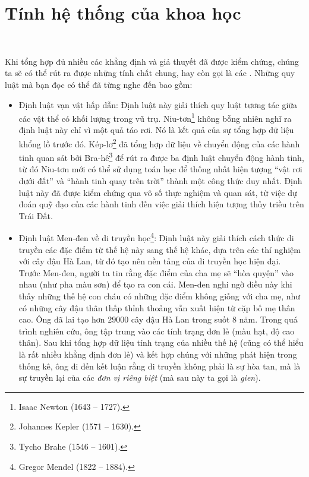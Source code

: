 \section{Tính hệ thống của khoa học}

\

Khi tổng hợp đủ nhiều các khẳng định và giả thuyết đã được kiểm chứng, chúng ta sẽ có thể rút ra được những tính chất chung, hay còn gọi là các . Những quy luật mà bạn đọc có thể đã từng nghe đến bao gồm:
\begin{itemize}
    \item \textcolor{colorEmphasisCyan}{Định luật vạn vật hấp dẫn}: Định luật này giải thích quy luật tương tác giữa các vật thể có khối lượng trong vũ trụ. Niu-tơn\footnote{Isaac Newton (1643 -- 1727).} không bỗng nhiên nghĩ ra định luật này chỉ vì một quả táo rơi. Nó là kết quả của sự tổng hợp dữ liệu khổng lồ trước đó. Kép-lơ\footnote{Johannes Kepler (1571 -- 1630).} đã tổng hợp dữ liệu về chuyển động của các hành tinh quan sát bởi Bra-hê\footnote{Tycho Brahe (1546 -- 1601).} để rút ra được ba định luật chuyển động hành tinh, từ đó Niu-tơn mới có thể sử dụng toán học để thống nhất hiện tượng ``vật rơi dưới đất'' và ``hành tinh quay trên trời'' thành một công thức duy nhất. Định luật này đã được kiểm chứng qua vô số thực nghiệm và quan sát, từ việc dự đoán quỹ đạo của các hành tinh đến việc giải thích hiện tượng thủy triều trên Trái Đất.

    \item \textcolor{colorEmphasis}{Định luật Men-đen về di truyền học}\footnote{Gregor Mendel (1822 -- 1884).}: Định luật này giải thích cách thức di truyền các đặc điểm từ thế hệ này sang thế hệ khác, dựa trên các thí nghiệm với cây đậu Hà Lan, từ đó tạo nên nền tảng của di truyền học hiện đại. Trước Men-đen, người ta tin rằng đặc điểm của cha mẹ sẽ ``hòa quyện'' vào nhau (như pha màu sơn) để tạo ra con cái. Men-đen nghi ngờ điều này khi thấy những thế hệ con cháu có những đặc điểm không giống với cha mẹ, như có những cây đậu thân thấp thỉnh thoảng vẫn xuất hiện từ cặp bố mẹ thân cao. Ông đã lai tạo hơn $\num{29000}$ cây đậu Hà Lan trong suốt $8$ năm. Trong quá trình nghiên cứu, ông tập trung vào các tính trạng đơn lẻ (màu hạt, độ cao thân). Sau khi tổng hợp dữ liệu tính trạng của nhiều thế hệ (cũng có thể hiểu là rất nhiều khẳng định đơn lẻ) và kết hợp chúng với những phát hiện trong thống kê, ông đi đến kết luận rằng di truyền không phải là sự hòa tan, mà là sự truyền lại của các \emph{đơn vị riêng biệt} (mà sau này ta gọi là \emph{gien}).


\end{itemize}
